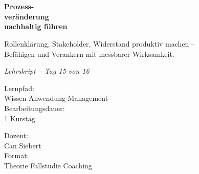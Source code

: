 \documentclass[11pt,a4paper,oneside]{article}
\newcommand{\caveatfontfallback}{\itshape}
\newcommand\caveatfont{\caveatfontfallback}%
\begin{document}
\begin{titlepage}
  \pagestyle{empty}
  \vspace*{1.5cm}
  \\[2pt]
  \noindent{\color{lpAccent}\rule{\linewidth}{1.2pt}}\\[4pt]

  \vspace{3cm}
  {\sffamily\fontsize{30}{34}\selectfont\bfseries\color{lpInk}Prozess-\\veränderung\\nachhaltig führen\par}

  \vspace{0.7cm}
  {\sffamily\large\color{lpGray}Rollenklärung, Stakeholder, Widerstand produktiv machen --\\Befähigen und Verankern mit messbarer Wirksamkeit.\par}

  \vspace{1.5cm}
  {\caveatfont\LARGE\color{lpAmber}Lehrskript -- Tag 15 von 16}\par

  \vfill

  \noindent\begin{minipage}{0.55\linewidth}
    {\sffamily\footnotesize\color{lpGray}Lernpfad:}\\
    {\sffamily\small\color{lpInk}Wissen \textrightarrow{} Anwendung \textrightarrow{} Management}\\[10pt]
    {\sffamily\footnotesize\color{lpGray}Bearbeitungsdauer:}\\
    {\sffamily\small\color{lpInk}1 Kurstag}
  \end{minipage}\hfill
  \begin{minipage}{0.4\linewidth}
    \raggedleft
    {\sffamily\footnotesize\color{lpGray}Dozent:}\\
    {\sffamily\small\color{lpInk}Can Siebert}\\[10pt]
    {\sffamily\footnotesize\color{lpGray}Format:}\\
    {\sffamily\small\color{lpInk}Theorie \textperiodcentered{} Fallstudie \textperiodcentered{} Coaching}
  \end{minipage}

  \vspace{0.5cm}
  \noindent{\color{lpAccent}\rule{\linewidth}{0.6pt}}
\end{titlepage}
\end{document}
